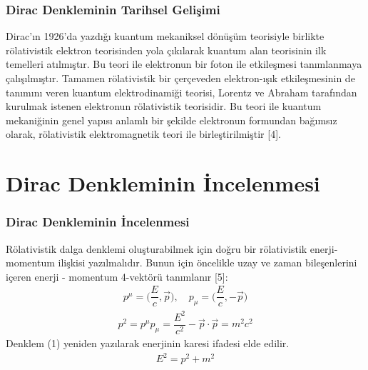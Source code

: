 \documentclass[aspectratio=169,10pt]{beamer}
\begin{document}
\begin{frame}[allowframebreaks]
\frametitle{Dirac Denkleminin Tarihsel Gelişimi}

Dirac’ın 1926’da yazdığı kuantum mekaniksel dönüşüm teorisiyle birlikte rölativistik elektron teorisinden yola çıkılarak kuantum alan teorisinin ilk temelleri atılmıştır. Bu teori ile elektronun bir foton ile etkileşmesi tanımlanmaya çalışılmıştır. Tamamen rölativistik bir çerçeveden elektron-ışık etkileşmesinin de tanımını veren kuantum elektrodinamiği teorisi, Lorentz ve Abraham tarafından kurulmak istenen elektronun rölativistik teorisidir. Bu teori ile kuantum mekaniğinin genel yapısı anlamlı bir şekilde elektronun formundan bağımsız olarak, rölativistik elektromagnetik teori ile birleştirilmiştir [4].



\end{frame}
	
	
	\section{Dirac Denkleminin İncelenmesi}
	\begin{frame}[allowframebreaks]
\frametitle{Dirac Denkleminin İncelenmesi}

Rölativistik dalga denklemi oluşturabilmek için doğru bir rölativistik enerji-momentum ilişkisi yazılmalıdır. Bunun için öncelikle uzay ve zaman bileşenlerini içeren enerji - momentum 4-vektörü tanımlanır [5]:
\begin{align}
    p^{\mu} = \big( \dfrac{E}{c},\Vec{p} \big), \quad p_{\mu} = \big( \dfrac{E}{c},-\Vec{p} \big)
\end{align}
\begin{align}
    p^{2} = p^{\mu}p_{\mu} = \dfrac{E^{2}}{c^{2}} - \Vec{p} \cdot \Vec{p} = m^{2} c^{2}
\end{align}
Denklem (1) yeniden yazılarak enerjinin karesi ifadesi elde edilir.
\begin{align}
    E^{2} = p^{2} + m^{2}
\end{align}
\end{frame}
\end{document}

